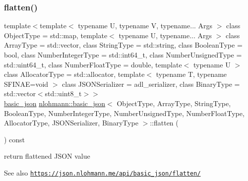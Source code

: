 \subsubsection{\texorpdfstring{flatten()}{flatten()}}
{\footnotesize\ttfamily template$<$template$<$ typename U, typename V, typename... Args $>$ class Object\+Type = std\+::map, template$<$ typename U, typename... Args $>$ class Array\+Type = std\+::vector, class String\+Type  = std\+::string, class Boolean\+Type  = bool, class Number\+Integer\+Type  = std\+::int64\+\_\+t, class Number\+Unsigned\+Type  = std\+::uint64\+\_\+t, class Number\+Float\+Type  = double, template$<$ typename U $>$ class Allocator\+Type = std\+::allocator, template$<$ typename T, typename S\+F\+I\+N\+A\+E=void $>$ class J\+S\+O\+N\+Serializer = adl\+\_\+serializer, class Binary\+Type  = std\+::vector$<$std\+::uint8\+\_\+t$>$$>$ \\
\hyperlink{classnlohmann_1_1basic__json}{basic\+\_\+json} \hyperlink{classnlohmann_1_1basic__json}{nlohmann\+::basic\+\_\+json}$<$ Object\+Type, Array\+Type, String\+Type, Boolean\+Type, Number\+Integer\+Type, Number\+Unsigned\+Type, Number\+Float\+Type, Allocator\+Type, J\+S\+O\+N\+Serializer, Binary\+Type $>$\+::flatten (\begin{DoxyParamCaption}{ }\end{DoxyParamCaption}) const\hspace{0.3cm}{\ttfamily [inline]}}



return flattened J\+S\+ON value 

\begin{DoxySeeAlso}{See also}
\href{https://json.nlohmann.me/api/basic_json/flatten/}{\tt https\+://json.\+nlohmann.\+me/api/basic\+\_\+json/flatten/} 
\end{DoxySeeAlso}
\mbox{\label{classnlohmann_1_1basic__json_a4e02793f2691aa29ab7cb69fddafbf5c}} 
